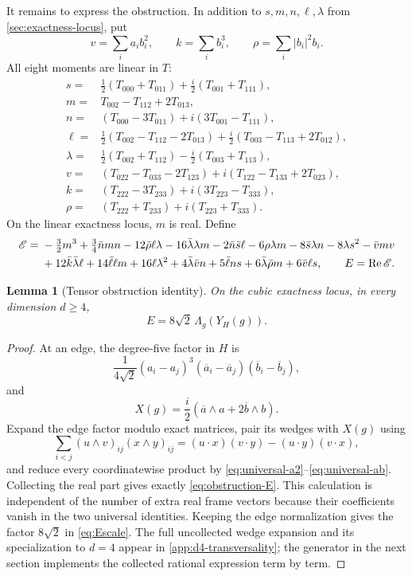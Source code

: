 \documentclass[11pt,reqno]{amsart}
\newtheorem{lemma}[theorem]{Lemma}
\theoremstyle{remark}
\newcommand{\abs}[1]{\left\lvert #1\right\rvert}
\begin{document}
It remains to express the obstruction.  In addition to $s,m,n,\ell,\lambda$
from \cref{sec:exactness-locus}, put
\[
 v=\sum_i a_i b_i^2,
 \qquad k=\sum_i b_i^3,
 \qquad \rho=\sum_i\abs{b_i}^2b_i.
\]
All eight moments are linear in $T$:
\begin{align*}
 s={}&\tfrac12(T_{000}+T_{011})
       +\tfrac i2(T_{001}+T_{111}),\\
 m={}&T_{002}-T_{112}+2T_{013},\\
 n={}&(T_{000}-3T_{011})+i(3T_{001}-T_{111}),\\
 \ell={}&\tfrac12(T_{002}-T_{112}-2T_{013})
       +\tfrac i2(T_{003}-T_{113}+2T_{012}),\\
 \lambda={}&\tfrac12(T_{002}+T_{112})
       -\tfrac i2(T_{003}+T_{113}),\\
 v={}&(T_{022}-T_{033}-2T_{123})
       +i(T_{122}-T_{133}+2T_{023}),\\
 k={}&(T_{222}-3T_{233})+i(3T_{223}-T_{333}),\\
 \rho={}&(T_{222}+T_{233})+i(T_{223}+T_{333}).
\end{align*}
On the linear exactness locus, $m$ is real.  Define
\begin{align}
 \mathscr E={}&-\tfrac32m^3+\tfrac34\bar nmn
 -12\bar\rho\ell\lambda-16\bar\lambda\lambda m
 -2\bar n\bar s\ell-6\rho\lambda m
 -8\bar s\lambda n-8\lambda s^2-\bar v m v\notag\\
 &+12\bar k\bar\lambda\ell+14\bar\ell\ell m
 +16\ell\lambda^2+4\bar\lambda\bar v n
 +5\bar\ell ns+6\bar\lambda\bar\rho m+6\bar v\ell s,
 \qquad E=\operatorname{Re}\mathscr E.
\label{eq:obstruction-E}
\end{align}

\begin{lemma}[Tensor obstruction identity]\label{lem:Escale}
On the cubic exactness locus, in every dimension $d\ge4$,
\begin{equation}\label{eq:Escale}
 E=8\sqrt2\,\Lambda_g(Y_H(g)).
\end{equation}
\end{lemma}

\begin{proof}
At an edge, the degree-five factor in $H$ is
\[
 \frac1{4\sqrt2}(a_i-a_j)^3
 (\overline a_i-\overline a_j)(\overline b_i-\overline b_j),
\]
and
\[
 X(g)=\frac i2(\overline a\wedge a+2\overline b\wedge b).
\]
Expand the edge factor modulo exact matrices, pair its wedges with $X(g)$
using
\[
 \sum_{i<j}(u\wedge v)_{ij}(x\wedge y)_{ij}
 =(u\cdot x)(v\cdot y)-(u\cdot y)(v\cdot x),
\]
and reduce every coordinatewise product by
\eqref{eq:universal-a2}--\eqref{eq:universal-ab}.  Collecting the real part
gives exactly \eqref{eq:obstruction-E}.  This calculation is independent of
the number of extra real frame vectors because their coefficients vanish in
the two universal identities.  Keeping the edge normalization gives the
factor $8\sqrt2$ in \eqref{eq:Escale}.  The full uncollected wedge expansion
and its specialization to $d=4$ appear in
\cref{app:d4-transversality}; the generator in the next section
implements the collected rational expression term by term.
\end{proof}
\end{document}
